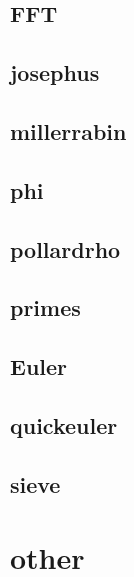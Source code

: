 \documentclass[a4paper,10pt,twocolumn,oneside]{article}
\begin{document}
    \subsection{FFT}
    

    \subsection{josephus}
    

    \vspace{1.2em}
    \vspace{1.2em}
    \subsection{millerrabin}
    

    \subsection{phi}
    

    \subsection{pollardrho}
    

    \subsection{primes}
    

    \subsection{Euler}
    

    \subsection{quickeuler}
    

    \subsection{sieve}
    

\section{other}
\end{document}
